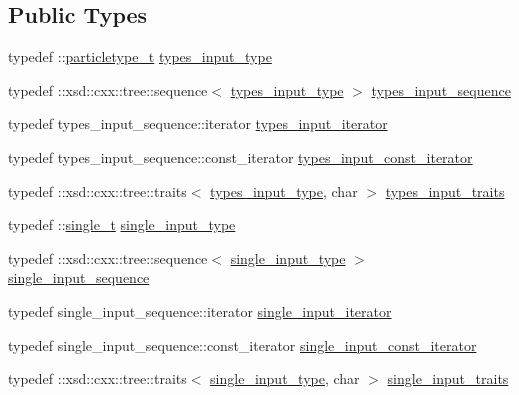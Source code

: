 \subsection*{Public Types}
\begin{DoxyCompactItemize}
\item 
typedef \+::\hyperlink{classparticletype__t}{particletype\+\_\+t} \hyperlink{classinput__t_a516c75c9426ee0026078ebe9ee6f50ea}{types\+\_\+input\+\_\+type}
\item 
typedef \+::xsd\+::cxx\+::tree\+::sequence$<$ \hyperlink{classinput__t_a516c75c9426ee0026078ebe9ee6f50ea}{types\+\_\+input\+\_\+type} $>$ \hyperlink{classinput__t_a48f5b9f6b00c9d3749caf0e3a0eac5a7}{types\+\_\+input\+\_\+sequence}
\item 
typedef types\+\_\+input\+\_\+sequence\+::iterator \hyperlink{classinput__t_a830eb55890cdf67c70880536db78be04}{types\+\_\+input\+\_\+iterator}
\item 
typedef types\+\_\+input\+\_\+sequence\+::const\+\_\+iterator \hyperlink{classinput__t_a7fddef7619e8c4dd76b1c6448c42bfc0}{types\+\_\+input\+\_\+const\+\_\+iterator}
\item 
typedef \+::xsd\+::cxx\+::tree\+::traits$<$ \hyperlink{classinput__t_a516c75c9426ee0026078ebe9ee6f50ea}{types\+\_\+input\+\_\+type}, char $>$ \hyperlink{classinput__t_a7ab3dea1712373b005d910f827cd9753}{types\+\_\+input\+\_\+traits}
\item 
typedef \+::\hyperlink{classsingle__t}{single\+\_\+t} \hyperlink{classinput__t_af24fd90c4a0fa092c577776efca1c750}{single\+\_\+input\+\_\+type}
\item 
typedef \+::xsd\+::cxx\+::tree\+::sequence$<$ \hyperlink{classinput__t_af24fd90c4a0fa092c577776efca1c750}{single\+\_\+input\+\_\+type} $>$ \hyperlink{classinput__t_a1296075494d97da854dc2be8b1022061}{single\+\_\+input\+\_\+sequence}
\item 
typedef single\+\_\+input\+\_\+sequence\+::iterator \hyperlink{classinput__t_a001a8bb6bb06d71002249f491bc628fa}{single\+\_\+input\+\_\+iterator}
\item 
typedef single\+\_\+input\+\_\+sequence\+::const\+\_\+iterator \hyperlink{classinput__t_ac6c5ac99d56764bfdf61d747cd2c2074}{single\+\_\+input\+\_\+const\+\_\+iterator}
\item 
typedef \+::xsd\+::cxx\+::tree\+::traits$<$ \hyperlink{classinput__t_af24fd90c4a0fa092c577776efca1c750}{single\+\_\+input\+\_\+type}, char $>$ \hyperlink{classinput__t_aa3a5fc9d04df805785a23a89248fa924}{single\+\_\+input\+\_\+traits}
\item 

\end{DoxyCompactItemize}
